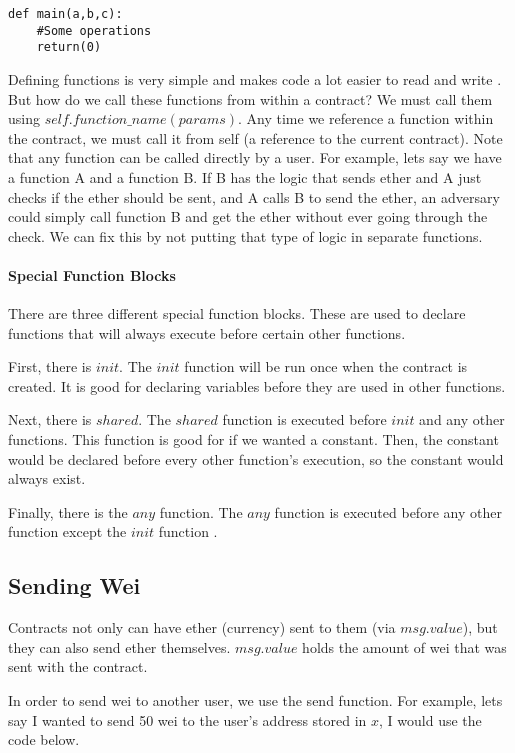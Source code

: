 \documentclass[12pt]{article}
\begin{document}
\begin{verbatim}
def main(a,b,c):
	#Some operations
	return(0)
\end{verbatim}

Defining functions is very simple and makes code a lot easier to read and write \cite{Serpent}. But how do we call these functions from within a contract? We must call them using $self.function\_name(params)$. Any time we reference a function within the contract, we must call it from self (a reference to the current contract). Note that any function can be called directly by a user. For example, lets say we have a function A and a function B. If B has the logic that sends ether and A just checks if the ether should be sent, and A calls B to send the ether, an adversary could simply call function B and get the ether without ever going through the check. We can fix this by not putting that type of logic in separate functions.

\paragraph{Special Function Blocks}
There are three different special function blocks. These are used to declare functions that will always execute before certain other functions.

First, there is $init$. The $init$ function will be run once when the contract is created. It is good for declaring variables before they are used in other functions.

Next, there is $shared$. The $shared$ function is executed before $init$ and any other functions. This function is good for if we wanted a constant. Then, the constant would be declared before every other function's execution, so the constant would always exist.

Finally, there is the $any$ function. The $any$ function is executed before any other function except the $init$ function \cite{Serpent}.

\subsection{Sending Wei}
Contracts not only can have ether (currency) sent to them (via $msg.value$), but they can also send ether themselves. $msg.value$ holds the amount of wei that was sent with the contract.

In order to send wei to another user, we use the send function. For example, lets say I wanted to send 50 wei to the user's address stored in $x$, I would use the code below.
\end{document}
